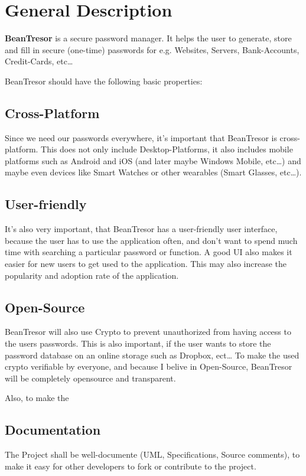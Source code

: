 \documentclass[11pt,a4paper,titlepage,portrait,english,final]{scrartcl}
\begin{document}
\section{General Description}
\textbf{BeanTresor} is a secure password manager. It helps the user to generate, store and fill in secure (one-time) passwords for e.g. Websites, Servers, Bank-Accounts, Credit-Cards, etc\ldots

BeanTresor should have the following basic properties:

\subsection{Cross-Platform}
Since we need our passwords everywhere, it's important that BeanTresor is cross-platform. This does not only include Desktop-Platforms, it also includes mobile platforms such as Android and iOS (and later maybe Windows Mobile, etc\ldots) and maybe even devices like Smart Watches or other wearables (Smart Glasses, etc\ldots).

\subsection{User-friendly}
It's also very important,  that BeanTresor has a user-friendly user interface, because the user has to use the application often, and don't want to spend much time with searching a particular password or function. A good UI also makes it easier for new users to get used to the application. This may also increase the popularity and adoption rate of the application.

\subsection{Open-Source}
BeanTresor will also use Crypto to prevent unauthorized from having access to the users passwords. This is also important, if the user wants to store the password database on an online storage such as Dropbox, ect\ldots
To make the used crypto verifiable by everyone, and because I belive in Open-Source, BeanTresor will be completely opensource and transparent.

Also, to make the 

\subsection{Documentation}
The Project shall be well-documente (UML, Specifications, Source comments), to make it easy for other developers to fork or contribute to the project.
\end{document}
